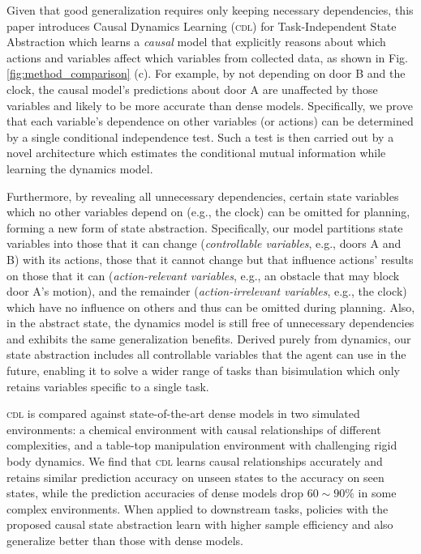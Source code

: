 Given that good generalization requires only keeping necessary dependencies, this paper introduces Causal Dynamics Learning  (\textsc{cdl}) for Task-Independent State Abstraction which learns a \emph{causal} model that explicitly reasons about which actions and variables affect which variables from collected data, as shown in Fig. \ref{fig:method_comparison} (c). For example, by not depending on door B and the clock, the causal model's predictions about door A are unaffected by those variables and likely to be more accurate than dense models.
Specifically, we prove that each variable's dependence on other variables (or actions) can be determined by a single conditional independence test. Such a test is then carried out by a novel architecture which estimates the conditional mutual information while learning the dynamics model.

Furthermore, by revealing all unnecessary dependencies, certain state variables which no other variables depend on (e.g., the clock) can be omitted for planning, forming a new form of state abstraction. Specifically, our model partitions state variables into those that it can change (\emph{controllable variables}, e.g., doors A and B) with its actions, those that it cannot change but that influence actions' results on those that it can (\emph{action-relevant variables}, e.g., an obstacle that may block door A's motion), and the remainder (\emph{action-irrelevant variables}, e.g., the clock) which have no influence on others and thus can be omitted during planning. Also, in the abstract state, the dynamics model is still free of unnecessary dependencies and exhibits the same generalization benefits. Derived purely from dynamics, our state abstraction includes all controllable variables that the agent can use in the future, enabling it to solve a wider range of tasks than bisimulation which only retains variables specific to a single task.

\textsc{cdl} is compared against state-of-the-art dense models in two simulated environments: a chemical environment with causal relationships of different complexities, and a table-top manipulation environment with challenging rigid body dynamics. We find that \textsc{cdl} learns causal relationships accurately and retains similar prediction accuracy on unseen states to the accuracy on seen states, while the prediction accuracies of dense models drop $60 \sim 90\%$ in some complex environments. When applied to downstream tasks, policies with the proposed causal state abstraction learn with higher sample efficiency and also generalize better than those with dense models.